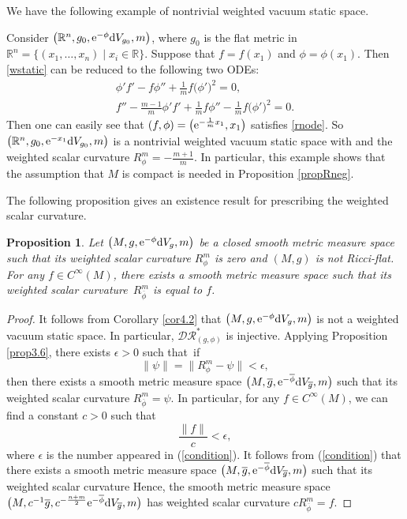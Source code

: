 \documentclass[10pt,a4paper]{amsart}
\numberwithin{equation}{section}
\newtheorem{Proposition}[Theorem]{Proposition}
 { \theoremstyle{definition}
\newtheorem{Definition}[Theorem]{Definition}
\newtheorem{Note}[Theorem]{Note}
\newtheorem{Example}[Theorem]{Example}
\newtheorem{Remark}[Theorem]{Remark} }
\begin{document}
We have the following example of
 nontrivial weighted vacuum static space.

\begin{Example}
 Consider $\bigl(\mathbb{R}^n,g_0,{\rm e}^{-\phi}{\rm d}V_{g_0},m\bigr)$, where $g_0$ is the flat metric in $\mathbb{R}^n=\{(x_1,\dots,x_n)\mid \allowbreak x_i\in\mathbb{R}\}$. Suppose that $f=f(x_1)$ and $\phi=\phi(x_1)$. Then \eqref{wstatic} can be reduced to the following two ODEs:
 \begin{gather}\label{rnode}
 \phi'f'-f\phi''+\frac{1}{m}f\bigl(\phi'\bigr)^2=0,\\
f''-\frac{m-1}{m}\phi'f'+\frac{1}{m}f\phi''-\frac{1}{m}f\bigl(\phi'\bigr)^2=0.
 \end{gather}
Then one can easily see that $(f,\phi)=\bigl({\rm e}^{-\frac{1}{m}x_1},x_1\bigr)$ satisfies \eqref{rnode}. So $\bigl(\mathbb{R}^n,g_0,{\rm e}^{-x_1}{\rm d}V_{g_0},m\bigr)$ is a nontrivial weighted vacuum static space with  and the weighted scalar curvature $R_\phi^m=-\frac{m+1}{m}$.
In particular, this example shows that the assumption that $M$ is compact is needed in Proposition \ref{propRneg}.
\end{Example}

The following proposition gives an existence result
for prescribing the weighted scalar curvature.

\begin{Proposition}\label{prop4.2}
Let $\bigl(M,g,{\rm e}^{-\phi}{\rm d}V_g,m\bigr)$ be a closed smooth metric measure space
such that its weighted scalar curvature $R_\phi^m$ is zero
and $(M,g)$ is not Ricci-flat.
For any $f\in C^\infty(M)$,
there exists a
smooth metric measure space  such that
its weighted scalar curvature~$R_{\overline{\phi}}^m$ is equal to $f$.
\end{Proposition}
\begin{proof}
It follows from Corollary \ref{cor4.2} that
$\bigl(M,g,{\rm e}^{-\phi}{\rm d}V_g,m\bigr)$ is not a weighted vacuum static space.
In particular, $\mathcal{DR}_{(g,\phi)}^*$ is injective. Applying Proposition \ref{prop3.6}, there exists $\epsilon>0$ such that~if%
\begin{equation}\label{condition}
\|\psi\|=\|R_\phi^m-\psi\|<\epsilon,
\end{equation}
then there exists a smooth metric measure space $\bigl(M,\overline{g},{\rm e}^{-\overline{\phi}}{\rm d}V_{\overline{g}},m\bigr)$
such that its weighted scalar curvature $R_{\overline{\phi}}^m=\psi$.
In particular, for any $f\in C^\infty(M)$, we can find a constant $c>0$ such that
\[\frac{\|f\|}{c}<\epsilon,\]
where $\epsilon$ is the number appeared in (\ref{condition}).
It follows from (\ref{condition}) that
there exists a smooth metric measure space $\bigl(M,\overline{g},{\rm e}^{-\overline{\phi}}{\rm d}V_{\overline{g}},m\bigr)$
such that its weighted scalar curvature 
Hence, the smooth metric measure space $\bigl(M,c^{-1}\overline{g},c^{-\frac{n+m}{2}}{\rm e}^{-\overline{\phi}}{\rm d}V_{\overline{g}},m\bigr)$
has weighted scalar curvature $cR_{\overline{\phi}}^m=f$.
\end{proof}
\end{document}
